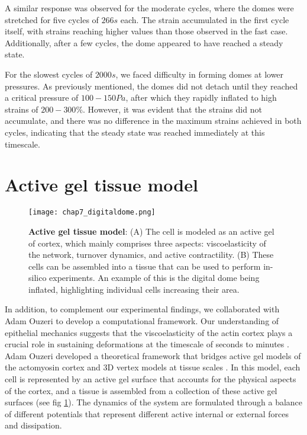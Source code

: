 A similar response was observed for the moderate cycles, where the domes were stretched for five cycles of $266 s$ each. The strain accumulated in the first cycle itself, with strains reaching higher values than those observed in the fast case. Additionally, after a few cycles, the dome appeared to have reached a steady state.

For the slowest cycles of $2000 s$, we faced difficulty in forming domes at lower pressures. As previously mentioned, the domes did not detach until they reached a critical pressure of $100-150 Pa$, after which they rapidly inflated to high strains of $200-300\%$. However, it was evident that the strains did not accumulate, and there was no difference in the maximum strains achieved in both cycles, indicating that the steady state was reached immediately at this timescale.

\hypertarget{active-gel-tissue-model}{%
	\section{Active gel tissue model}\label{active-gel-tissue-model}}

\begin{figure} [h!]
	\centering
	\texttt{[image: chap7\_digitaldome.png]}
	\caption{\label{fig_7_2} \textbf{Active gel tissue model}: (A) The cell is modeled as an active gel of cortex, which mainly comprises three aspects: viscoelasticity of the network, turnover dynamics, and active contractility. (B) These cells can be assembled into a tissue that can be used to perform in-silico experiments. An example of this is the digital dome being inflated, highlighting individual cells increasing their area.}
\end{figure}

In addition, to complement our experimental findings, we collaborated with Adam Ouzeri to develop a computational framework. Our understanding of epithelial mechanics suggests that the viscoelasticity of the actin cortex plays a crucial role in sustaining deformations at the timescale of seconds to minutes \cite{kelkar2020,clement2017,khalilgharibi2019}. Adam Ouzeri developed a theoretical framework that bridges active gel models of the actomyosin cortex and 3D vertex models at tissue scales  \cite{ouzeri2023}. In this model, each cell is represented by an active gel surface that accounts for the physical aspects of the cortex, and a tissue is assembled from a collection of these active gel surfaces (see fig \ref{fig_7_2}). The dynamics of the system are formulated through a balance of different potentials that represent different active internal or external forces and dissipation.

